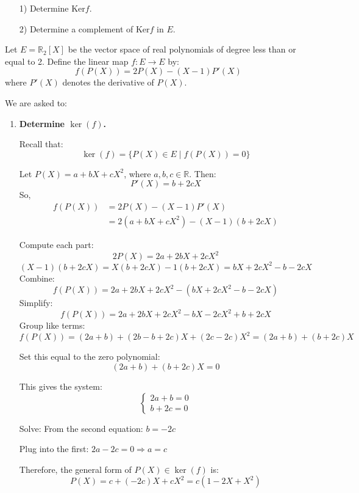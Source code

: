 \documentclass[12pt]{article}
\begin{document}
\begin{enumerate}
    \item[1)] Determine $\text{Ker}f$.
    \item[2)] Determine a complement of $\text{Ker}f$ in $E$.
\end{enumerate}

\newpage

\begin{answerbox}
Let $ E = \mathbb{R}_2[X] $ be the vector space of real polynomials of degree less than or equal to 2. Define the linear map $ f: E \to E $ by:
$$
f(P(X)) = 2P(X) - (X - 1)P'(X)
$$
where $ P'(X) $ denotes the derivative of $ P(X) $.

We are asked to:

\begin{enumerate}
    \item \textbf{Determine $ \ker(f) $.}
    
    Recall that:
    $$
    \ker(f) = \{ P(X) \in E \mid f(P(X)) = 0 \}
    $$

    Let $ P(X) = a + bX + cX^2 $, where $ a, b, c \in \mathbb{R} $. Then:
    $$
    P'(X) = b + 2cX
    $$
    So,
    \begin{align*}
    f(P(X)) &= 2P(X) - (X - 1)P'(X) \\
    &= 2(a + bX + cX^2) - (X - 1)(b + 2cX)
    \end{align*}

    Compute each part:
    $$
    2P(X) = 2a + 2bX + 2cX^2
    $$
    $$
    (X - 1)(b + 2cX) = X(b + 2cX) - 1(b + 2cX) = bX + 2cX^2 - b - 2cX
    $$
    Combine:
    $$
    f(P(X)) = 2a + 2bX + 2cX^2 - (bX + 2cX^2 - b - 2cX)
    $$
    Simplify:
    $$
    f(P(X)) = 2a + 2bX + 2cX^2 - bX - 2cX^2 + b + 2cX
    $$
    Group like terms:
    $$
    f(P(X)) = (2a + b) + (2b - b + 2c)X + (2c - 2c)X^2 = (2a + b) + (b + 2c)X
    $$

    Set this equal to the zero polynomial:
    $$
    (2a + b) + (b + 2c)X = 0
    $$

    This gives the system:
    $$
    \begin{cases}
    2a + b = 0 \\
    b + 2c = 0
    \end{cases}
    $$

    Solve:
    From the second equation: $ b = -2c $

    Plug into the first: $ 2a - 2c = 0 \Rightarrow a = c $

    Therefore, the general form of $ P(X) \in \ker(f) $ is:
    $$
    P(X) = c + (-2c)X + cX^2 = c(1 - 2X + X^2)
    $$


\end{enumerate}
\end{answerbox}
\end{document}
